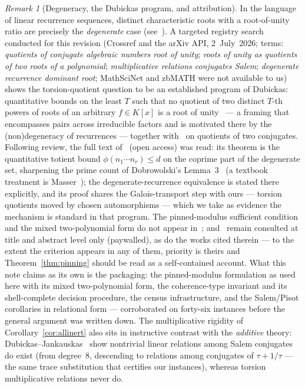 \documentclass[11pt]{article}
\theoremstyle{plain}
\theoremstyle{definition}
\theoremstyle{remark}
\newtheorem{remark}[theorem]{Remark}
\begin{document}
\begin{remark}[Degeneracy, the Dubickas program, and attribution]
\label{rem:degen}
In the language of linear recurrence sequences, distinct characteristic
roots with a root-of-unity ratio are precisely the \emph{degenerate} case
(see~\cite{EPSW}). A targeted registry search conducted for this revision
(Crossref and the arXiv API, 2~July~2026; terms: \emph{quotients of
conjugate algebraic numbers root of unity}; \emph{roots of unity as
quotients of two roots of a polynomial}; \emph{multiplicative relations
conjugates Salem}; \emph{degenerate recurrence dominant root}; MathSciNet
and zbMATH were not available to us) shows the torsion-quotient question to
be an established program of Dubickas: quantitative bounds on the least $T$
such that no quotient of two distinct $T$-th powers of roots of an
arbitrary $f\in K[x]$ is a root of unity~\cite{Dub2012} --- a framing that
encompasses pairs across irreducible factors and is motivated there by the
(non)degeneracy of recurrences --- together with~\cite{Dub2017, Dub2021} on
quotients of two conjugates. Following review, the full text
of~\cite{Dub2017} (open access) was read: its theorem is the quantitative
totient bound $\phi(n_1\cdots n_r)\le d$ on the coprime part of the
degenerate set, sharpening the prime count of Dobrowolski's
Lemma~3~\cite{Dobrowolski} (a textbook treatment is Masser~\cite{Masser});
the degenerate-recurrence equivalence is stated there explicitly, and its
proof shares the Galois-transport step with ours --- torsion quotients
moved by chosen automorphisms --- which we take as evidence the mechanism
is standard in that program. The pinned-modulus sufficient condition and
the mixed two-polynomial form do not appear in~\cite{Dub2017};
\cite{Dub2012} and~\cite{Dub2021} remain consulted at title and abstract
level only (paywalled), as do the works cited therein --- to the extent the
criterion appears in any of them, priority is theirs and
Theorem~\ref{thm:pinning} should be read as a self-contained account. What this note
claims as its own is the packaging: the pinned-modulus formulation as used
here with its mixed two-polynomial form, the coherence-type invariant and
its shell-complete decision procedure, the census infrastructure, and the
Salem/Pisot corollaries in relational form --- corroborated on forty-six
instances before the general argument was written down. The multiplicative
rigidity of Corollary~\ref{cor:allinert} also sits in instructive contrast
with the \emph{additive} theory: Dubickas--Jankauskas~\cite{DJ2020} show
nontrivial linear relations among Salem conjugates do exist (from
degree~$8$, descending to relations among conjugates of $\tau+1/\tau$ ---
the same trace substitution that certifies our instances), whereas torsion
multiplicative relations never do.
\end{remark}
\end{document}
